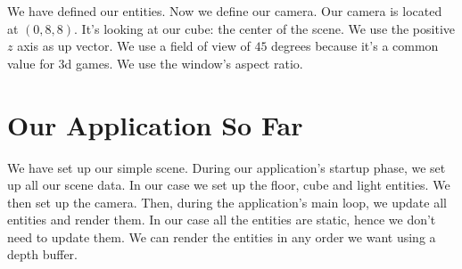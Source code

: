 We have defined our entities.
Now we define our camera.
Our camera is located at $(0, 8, 8)$.
It's looking at our cube: the center of the scene.
We use the positive $z$ axis as up vector.
We use a field of view of $45$ degrees because it's a common value for 3d games.
We use the window's aspect ratio.

\begin{minipage}{\linewidth}{\noindent}
    
\end{minipage}

\section{Our Application So Far}

We have set up our simple scene.
During our application's startup phase, we set up all our scene data.
In our case we set up the floor, cube and light entities.
We then set up the camera.
Then, during the application's main loop, we update all entities and render them.
In our case all the entities are static, hence we don't need to update them.
We can render the entities in any order we want using a depth buffer.

\begin{minipage}{\linewidth}{\noindent}
    
\end{minipage}

